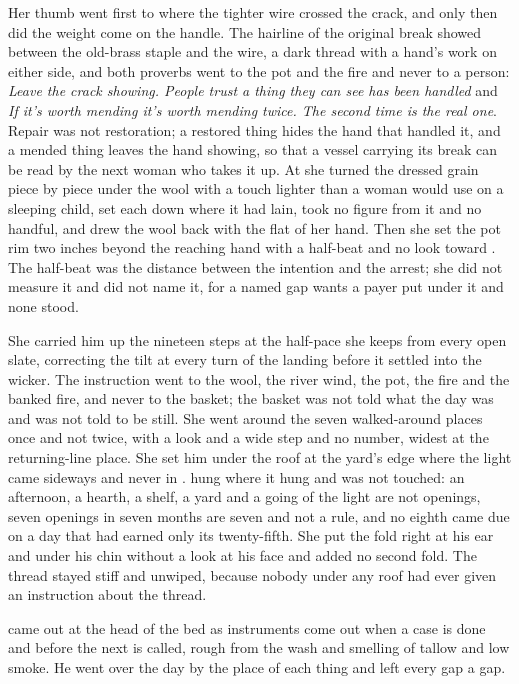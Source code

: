Her thumb went first to where the tighter wire crossed the crack, and only then did the weight come on the handle. The hairline of the original break showed between the old-brass staple and the wire, a dark thread with a hand's work on either side, and both proverbs went to the pot and the fire and never to a person: \emph{Leave the crack showing. People trust a thing they can see has been handled} and \emph{If it's worth mending it's worth mending twice. The second time is the real one}. Repair was not restoration; a restored thing hides the hand that handled it, and a mended thing leaves the hand showing, so that a vessel carrying its break can be read by the next woman who takes it up. At  she turned the dressed grain piece by piece under the wool with a touch lighter than a woman would use on a sleeping child, set each down where it had lain, took no figure from it and no handful, and drew the wool back with the flat of her hand. Then she set the pot rim two inches beyond the reaching hand with a half-beat and no look toward . The half-beat was the distance between the intention and the arrest; she did not measure it and did not name it, for a named gap wants a payer put under it and none stood.

She carried him up the nineteen steps at the half-pace she keeps from every open slate, correcting the tilt at every turn of the landing before it settled into the wicker. The instruction went to the wool, the river wind, the pot, the fire and the banked fire, and never to the basket; the basket was not told what the day was and was not told to be still. She went around the seven walked-around places once and not twice, with a look and a wide step and no number, widest at the returning-line place. She set him under the roof at the yard's edge where the light came sideways and never in .  hung where it hung and was not touched: an afternoon, a hearth, a shelf, a yard and a going of the light are not openings, seven openings in seven months are seven and not a rule, and no eighth came due on a day that had earned only its twenty-fifth. She put the fold right at his ear and under his chin without a look at his face and added no second fold. The thread stayed stiff and unwiped, because nobody under any roof had ever given an instruction about the thread.

\scenebreak

 came out at the head of the bed as instruments come out when a case is done and before the next is called, rough from the wash and smelling of tallow and low smoke. He went over the day by the place of each thing and left every gap a gap.

